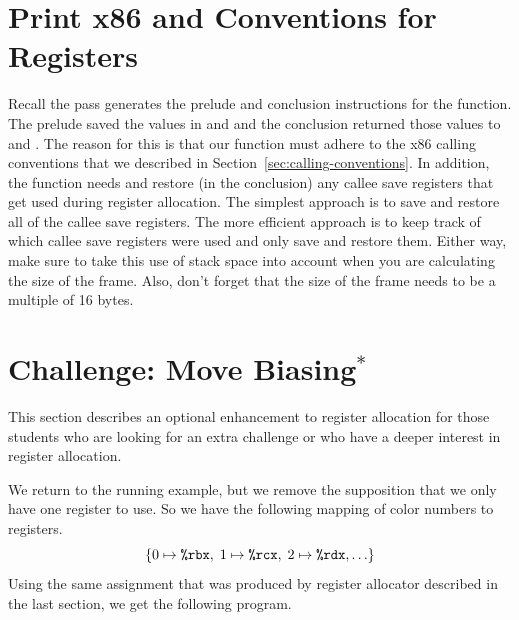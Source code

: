\documentclass[11pt]{book}
\begin{document}
\section{Print x86 and Conventions for Registers}
\label{sec:print-x86-reg-alloc}

Recall the  pass generates the prelude and
conclusion instructions for the  function.
%
The prelude saved the values in  and  and the
conclusion returned those values to  and .  The
reason for this is that our  function must adhere to the
x86 calling conventions that we described in
Section~\ref{sec:calling-conventions}. In addition, the 
function needs and restore (in the conclusion) any callee save
registers that get used during register allocation. The simplest
approach is to save and restore all of the callee save registers. The
more efficient approach is to keep track of which callee save
registers were used and only save and restore them. Either way, make
sure to take this use of stack space into account when you are
calculating the size of the frame. Also, don't forget that the size of
the frame needs to be a multiple of 16 bytes.

\section{Challenge: Move Biasing$^{*}$}
\label{sec:move-biasing}

This section describes an optional enhancement to register allocation
for those students who are looking for an extra challenge or who have
a deeper interest in register allocation.

We return to the running example, but we remove the supposition that
we only have one register to use. So we have the following mapping of
color numbers to registers.
\[
  \{ 0 \mapsto \texttt{\%rbx}, \; 1 \mapsto \texttt{\%rcx}, \; 2 \mapsto \texttt{\%rdx}, \ldots \}
\]
Using the same assignment that was produced by register allocator
described in the last section, we get the following program.
\end{document}
